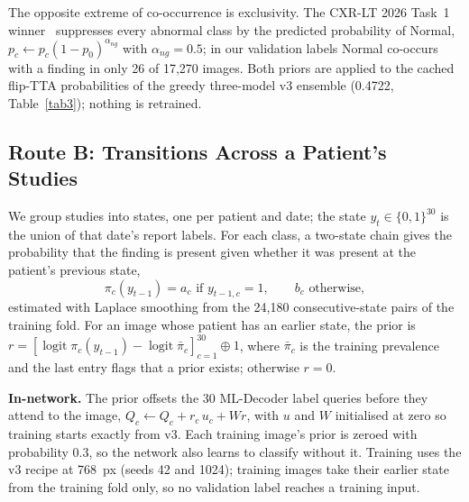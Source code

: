 \documentclass[conference]{IEEEtran}
\begin{document}
The opposite extreme of co-occurrence is exclusivity. The CXR-LT 2026 Task~1 winner~\cite{b15} suppresses every abnormal class by the predicted probability of Normal, $p_c \leftarrow p_c(1 - p_0)^{\alpha_{ng}}$ with $\alpha_{ng} = 0.5$; in our validation labels Normal co-occurs with a finding in only 26 of 17,270 images. Both priors are applied to the cached flip-TTA probabilities of the greedy three-model v3 ensemble (0.4722, Table~\ref{tab3}); nothing is retrained.

\subsection{Route B: Transitions Across a Patient's Studies}
\label{sec:mk-patient}
We group studies into states, one per patient and date; the state $y_t \in \{0,1\}^{30}$ is the union of that date's report labels. For each class, a two-state chain gives the probability that the finding is present given whether it was present at the patient's previous state,
\begin{equation}
\pi_c(y_{t-1}) = a_c \text{ if } y_{t-1,c} = 1, \qquad b_c \text{ otherwise},
\label{eq:chain}
\end{equation}
estimated with Laplace smoothing from the 24,180 consecutive-state pairs of the training fold. For an image whose patient has an earlier state, the prior is $r = [\operatorname{logit} \pi_c(y_{t-1}) - \operatorname{logit} \bar\pi_c]_{c=1}^{30} \oplus 1$, where $\bar\pi_c$ is the training prevalence and the last entry flags that a prior exists; otherwise $r = 0$.

\textbf{In-network.} The prior offsets the 30 ML-Decoder label queries before they attend to the image, $Q_c \leftarrow Q_c + r_c\, u_c + W r$, with $u$ and $W$ initialised at zero so training starts exactly from v3. Each training image's prior is zeroed with probability 0.3, so the network also learns to classify without it. Training uses the v3 recipe at 768~px (seeds 42 and 1024); training images take their earlier state from the training fold only, so no validation label reaches a training input.
\end{document}
